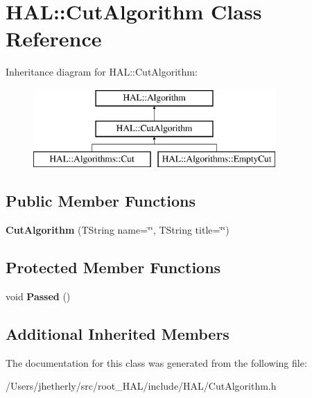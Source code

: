 \hypertarget{class_h_a_l_1_1_cut_algorithm}{\section{H\-A\-L\-:\-:Cut\-Algorithm Class Reference}
\label{class_h_a_l_1_1_cut_algorithm}
}
Inheritance diagram for H\-A\-L\-:\-:Cut\-Algorithm\-:\begin{figure}[H]
\begin{center}
\leavevmode
\includegraphics[height=3.000000cm]{class_h_a_l_1_1_cut_algorithm}
\end{center}
\end{figure}
\subsection*{Public Member Functions}
\begin{DoxyCompactItemize}
\item 
\hypertarget{class_h_a_l_1_1_cut_algorithm_a7009161a2b8463fddb9d6336cb2ef669}{{\bfseries Cut\-Algorithm} (T\-String name=\char`\"{}\char`\"{}, T\-String title=\char`\"{}\char`\"{})}\label{class_h_a_l_1_1_cut_algorithm_a7009161a2b8463fddb9d6336cb2ef669}

\end{DoxyCompactItemize}
\subsection*{Protected Member Functions}
\begin{DoxyCompactItemize}
\item 
\hypertarget{class_h_a_l_1_1_cut_algorithm_ad41a2ea5664562c3331f85bcc85317be}{void {\bfseries Passed} ()}\label{class_h_a_l_1_1_cut_algorithm_ad41a2ea5664562c3331f85bcc85317be}

\end{DoxyCompactItemize}
\subsection*{Additional Inherited Members}


The documentation for this class was generated from the following file\-:\begin{DoxyCompactItemize}
\item 
/\-Users/jhetherly/src/root\-\_\-\-H\-A\-L/include/\-H\-A\-L/Cut\-Algorithm.\-h\end{DoxyCompactItemize}

